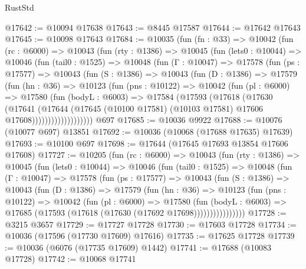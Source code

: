 \begin{lexlean}{RustStd}
\begin{coremodule}
{{@17642 := @10094 @17638
@17643 := @8445 @17587
@17644 := @17642 @17643
@17645 := @10098 @17643
@17684 := @10035
    (fun (fn : @33) =>
    @10042
      (fun (rc : @6000) =>
      @10043
        (fun (rty : @1386) =>
        @10045
          (fun (lets0 : @10044) =>
          @10046
            (fun (tail0 : @1525) =>
            @10048
              (fun (Γ : @10047) =>
              @17578
                (fun (ps : @17577) =>
                @10043
                  (fun (S : @1386) =>
                  @10043
                    (fun (D : @1386) =>
                    @17579
                      (fun (hn : @36) =>
                      @10123
                        (fun (pns : @10122) =>
                        @10042
                          (fun (pl : @6000) =>
                          @17580
                            (fun (bodyL : @6003) =>
                            @17584
                              (@17593
                                (@17618
                                  (@17630
                                    (@17641
                                      (@17644
                                        (@17645
                                          (@10100 @17581)
                                          (@10103 @17581)
                                          @17606
                                          @17608)))))))))))))))))))
    @697
@17685 := @10036 @9922
@17688 := @10076 (@10077 @697) @13851
@17692 := @10036 (@10068 (@17688 @17635) @17639)
@17693 := @10100 @697
@17698 := @17644 (@17645 @17693 @13854 @17606 @17608)
@17727 := @10205
    (fun (rc : @6000) =>
    @10043
      (fun (rty : @1386) =>
      @10045
        (fun (lets0 : @10044) =>
        @10046
          (fun (tail0 : @1525) =>
          @10048
            (fun (Γ : @10047) =>
            @17578
              (fun (ps : @17577) =>
              @10043
                (fun (S : @1386) =>
                @10043
                  (fun (D : @1386) =>
                  @17579
                    (fun (hn : @36) =>
                    @10123
                      (fun (pns : @10122) =>
                      @10042
                        (fun (pl : @6000) =>
                        @17580
                          (fun (bodyL : @6003) =>
                          @17685 (@17593 (@17618 (@17630 (@17692 @17698))))))))))))))))
@17728 := @3215 @3657
@17729 := @17727 @17728
@17730 := @17603 @17728
@17734 := @10036 (@17596 (@17730 @17609) @17616)
@17735 := @17625 @17728
@17739 := @10036 (@6076 (@17735 @17609) @1442)
@17741 := @17688 (@10083 @17728)
@17742 := @10068 @17741
}}
\end{coremodule}
\end{lexlean}
